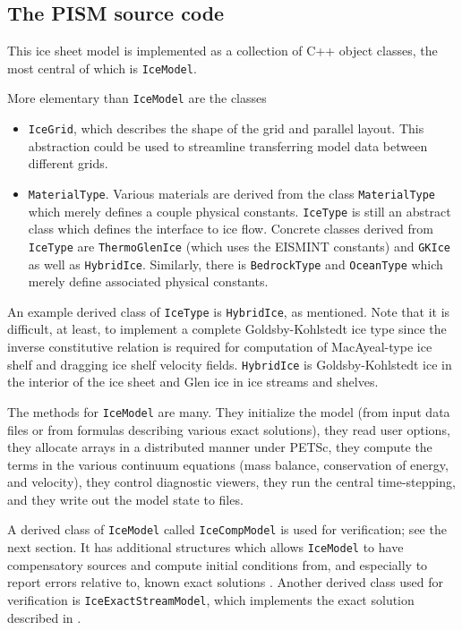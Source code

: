 \documentclass[11pt,final]{amsart}
\renewcommand{\t}[1]{\texttt{#1}}
\begin{document}
\subsection{The PISM source code} This ice sheet model is implemented as a collection of C++ object classes, the most central of which is \t{IceModel}.

More elementary than \t{IceModel} are the classes\begin{itemize}
\item \t{IceGrid}, which describes the shape of the grid and parallel
layout. This abstraction could be used to streamline transferring model data between
different grids.
\item \t{MaterialType}.  Various materials are derived from the class \t{MaterialType} which merely defines a couple
physical constants. \t{IceType} is still an abstract class which defines the interface to
ice flow. Concrete classes derived from \t{IceType} are \t{ThermoGlenIce} (which uses the
EISMINT constants) and \t{GKIce} as well as \t{HybridIce}.  Similarly, there is \t{BedrockType} and \t{OceanType} which merely define
associated physical constants.\end{itemize}

An example derived class of \t{IceType} is \t{HybridIce}, as mentioned.  Note that it is difficult, at least, to implement a complete Goldsby-Kohlstedt ice type \cite{GoldsbyKohlstedt} since the inverse constitutive
relation is required for computation of MacAyeal-type ice shelf and dragging ice shelf \cite{MacAyeal} velocity fields. \t{HybridIce} is Goldsby-Kohlstedt ice in the interior of the ice sheet and Glen ice in ice streams and
shelves.

The methods for \t{IceModel} are many.  They initialize the model (from input data files or from formulas describing various exact solutions), they read user options, they allocate arrays in a distributed manner under PETSc, they compute the terms in the various continuum equations (mass balance, conservation of energy, and velocity), they control diagnostic viewers, they run the central time-stepping, and they write out the model state to files.

A derived class of \t{IceModel} called \t{IceCompModel} is used for verification; see the next section.  It has additional structures which allows \t{IceModel} to have compensatory sources and compute initial conditions from, and especially to report errors relative to, known exact solutions \cite{BLKCB,BBL,BB}.  Another derived class used for verification is \t{IceExactStreamModel}, which implements the exact solution described in \cite{SchoofStream}.
\end{document}
